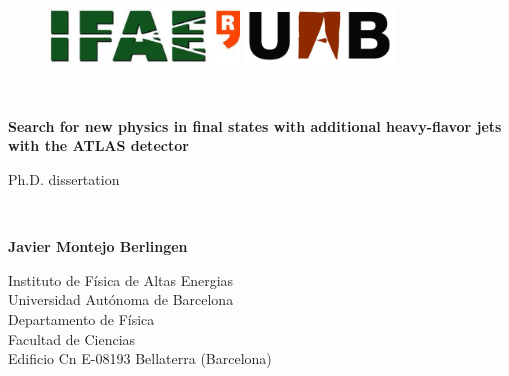 \thispagestyle{empty}

\begin{titlepage}
\begin{center}

\begin{figure}[h!]
\includegraphics[height=15mm]{Title/IFAE_logo}
\hfill
\includegraphics[height=15mm]{Title/uab_logo}
\end{figure}

\vspace{0.5cm}
\HRule\\
\vspace{0.2cm}
{\huge \bf Search for new physics in \boldmath{$\ttbar$} final states with additional heavy-flavor jets with the ATLAS detector
\par
  \vspace{0.5in}
Ph.D. dissertation}
\HRule\\
\par
\vspace{1.3in}

{\LARGE \bf Javier Montejo Berlingen}
\vspace{0.3cm}
\par
Instituto de F\'{i}sica de Altas Energias\\
Universidad Aut\'{o}noma de Barcelona\\
Departamento de F\'{i}sica\\
Facultad de Ciencias \\
Edificio Cn E-08193 Bellaterra (Barcelona)
\par
\vspace{0.5in}


\end{center}
\end{titlepage}
